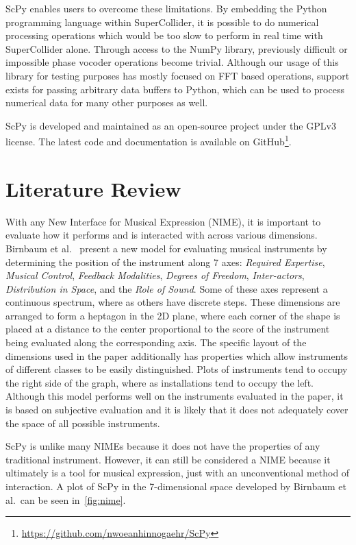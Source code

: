 \documentclass{article}
\begin{document}
ScPy enables users to overcome these limitations. By embedding the Python programming language
within SuperCollider, it is possible to do numerical processing operations which would be too slow
to perform in real time with SuperCollider alone. Through access to the NumPy library, previously
difficult or impossible phase vocoder operations become trivial. Although our usage of this library
for testing purposes has mostly focused on FFT based operations, support exists for passing
arbitrary data buffers to Python, which can be used to process numerical data for many other
purposes as well.

ScPy is developed and maintained as an open-source project under the GPLv3 license. The latest code
and documentation is available on GitHub\footnote{\url{https://github.com/nwoeanhinnogaehr/ScPy}}.

\section{Literature Review}\label{sec:lit}

With any New Interface for Musical Expression (NIME), it is important to evaluate how it performs
and is interacted with across various dimensions. Birnbaum et al.~\cite{birnbaum2005towards}
present a new model for evaluating musical instruments by determining the position of the
instrument along 7 axes: \textit{Required Expertise}, \textit{Musical Control}, \textit{Feedback
Modalities}, \textit{Degrees of Freedom}, \textit{Inter-actors}, \textit{Distribution in Space},
and the \textit{Role of Sound}. Some of these axes represent a continuous spectrum, where as others
have discrete steps. These dimensions are arranged to form a heptagon in the 2D plane, where each
corner of the shape is placed at a distance to the center proportional to the score of the
instrument being evaluated along the corresponding axis. The specific layout of the dimensions used
in the paper additionally has properties which allow instruments of different classes to be easily
distinguished. Plots of instruments tend to occupy the right side of the graph, where as
installations tend to occupy the left. Although this model performs well on the instruments
evaluated in the paper, it is based on subjective evaluation and it is likely that it does not
adequately cover the space of all possible instruments.

ScPy is unlike many NIMEs because it does not have the properties of any traditional instrument.
However, it can still be considered a NIME because it ultimately is a tool for musical expression,
just with an unconventional method of interaction. A plot of ScPy in the 7-dimensional space
developed by Birnbaum et al.\ can be seen in~\autoref{fig:nime}.
\end{document}
